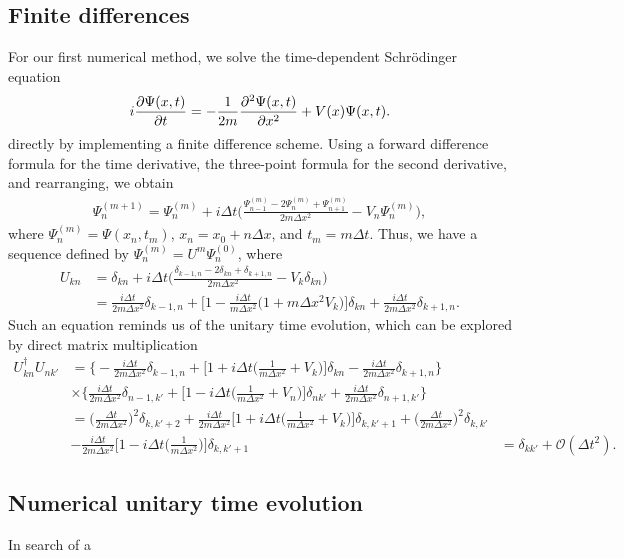 \subsection{Finite differences}
\label{ssec:finite-differences}

For our first numerical method, we solve the time-dependent Schr\"{o}dinger equation 
\begin{align}
    i \pdv{\Psi(x,t)}{t} = -\frac{1}{2m} \pdv[2]{\Psi(x,t)}{x} + V(x) \Psi(x,t)
.\end{align}
directly by implementing a finite difference scheme.
Using a forward difference formula for the time derivative, the three-point formula for the second derivative, and rearranging, we obtain
\begin{align}
    \Psi_{n}^{(m + 1)} = \Psi_{n}^{(m)} + i \Delta t \Bigg( \frac{\Psi_{n-1}^{(m)} - 2 \Psi_{n}^{(m)} + \Psi_{n+1}^{(m)}}{2m \Delta x^2} - V_{n} \Psi_{n}^{(m)} \Bigg)
,\end{align}
where $\Psi_{n}^{(m)} = \Psi(x_n,t_{m})$, $x_{n} = x_0 + n \Delta x$, and $t_{m} = m \Delta t$.
Thus, we have a sequence defined by $\Psi_{n}^{(m)} = U^{m} \Psi_{n}^{(0)}$, where
\begin{align}
    U_{kn} &= \delta_{kn} + i \Delta t \Big( \frac{\delta_{k-1,n} - 2 \delta_{kn} + \delta_{k+1,n}}{2m \Delta x^2} - V_{k} \delta_{kn} \Big) \nonumber \\
           &= \frac{i \Delta t}{2 m \Delta x^2} \delta_{k-1,n} + \Big[ 1 - \frac{i \Delta t}{m \Delta x^2} \Big( 1 + m \Delta x^2 V_{k} \Big) \Big] \delta_{kn} + \frac{i \Delta t}{2 m \Delta x^2} \delta_{k+1,n}
.\end{align}
Such an equation reminds us of the unitary time evolution, which can be explored by direct matrix multiplication
\begin{align}
    U_{kn}^{\dagger} U_{nk'} &= \Bigg\{ -\frac{i \Delta t}{2 m \Delta x^2} \delta_{k-1,n} + \Big[ 1 + i \Delta t \Big( \frac{1}{m \Delta x^2} + V_{k} \Big) \Big] \delta_{kn} - \frac{i \Delta t}{2 m \Delta x^2} \delta_{k+1,n} \Bigg\} \nonumber \\
    &\times \Bigg\{ \frac{i \Delta t}{2 m \Delta x^2} \delta_{n-1,k'} + \Big[ 1 - i \Delta t \Big( \frac{1}{m \Delta x^2} + V_{n} \Big) \Big] \delta_{nk'} + \frac{i \Delta t}{2 m \Delta x^2} \delta_{n+1,k'} \Bigg\} \nonumber \\
    &= \Big( \frac{\Delta t}{2 m \Delta x^2} \Big)^2 \delta_{k,k'+2} + \frac{i \Delta t}{2 m \Delta x^2} \Big[ 1 + i \Delta t \Big( \frac{1}{m \Delta x^2} + V_{k} \Big) \Big] \delta_{k,k'+1} + \Big( \frac{\Delta t}{2 m \Delta x^2} \Big)^2 \delta_{k,k'} \nonumber \\
    &- \frac{i \Delta t}{2 m \Delta x^2} \Big[ 1 - i \Delta t \Big( \frac{1}{m \Delta x^2} \Big) \Big] \delta_{k,k'+1}
    &= \delta_{k k'} + \mathcal{O}(\Delta t^2)
.\end{align}


\subsection{Numerical unitary time evolution}

In search of a 




    

